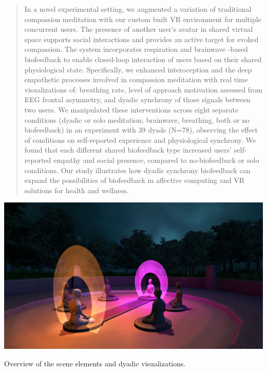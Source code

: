 \documentclass[manuscript, review = false, screen]{acmart}
\begin{document}
\begin{abstract}
In a novel experimental setting, we augmented a variation of traditional compassion meditation with our custom built VR environment for multiple concurrent users. The presence of another user's avatar in shared virtual space supports social interactions and provides an active target for evoked compassion. The system incorporates respiration and brainwave -based biofeedback to enable closed-loop interaction of users based on their shared physiological state. Specifically, we enhanced interoception and the deep empathetic processes involved in compassion meditation with real time visualizations of: breathing rate, level of approach motivation assessed from EEG frontal asymmetry, and dyadic synchrony of those signals between two users. We manipulated these interventions across eight separate conditions (dyadic or solo meditation; brainwave, breathing, both or no biofeedback) in an experiment with 39 dyads (N=78), observing the effect of conditions on self-reported experience and physiological synchrony. We found that each different shared biofeedback type increased users' self-reported empathy and social presence, compared to no-biofeedback or solo conditions. Our study illustrates how dyadic synchrony biofeedback can expand the possibilities of biofeedback in affective computing and VR solutions for health and wellness.
\end{abstract}



%
%

%


%
\begin{teaserfigure}
  \includegraphics[width=\textwidth]{images/DYNECOM_All_large.jpg}
  \caption{Overview of the scene elements and dyadic visualizations.}
  \label{fig:teaser}
\end{teaserfigure}
\end{document}
